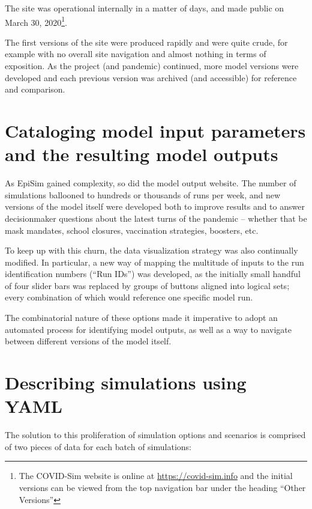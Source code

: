 The site was operational internally in a matter of days, and made public on March 30, 2020\footnote{The COVID-Sim website is online at \url{https://covid-sim.info} and the initial versions can be viewed from the top navigation bar under the heading ``Other Versions''}.

The first versions of the site were produced rapidly and were quite crude, for example with no overall site navigation and almost nothing in terms of exposition. As the project (and pandemic) continued, more model versions were developed and each previous version was archived (and accessible) for reference and comparison.

\hypertarget{covid-cataloging-model-input-parameters-and-the-resulting-model-outputs}{%
\section{Cataloging model input parameters and the resulting model outputs}\label{cataloging-model-input-parameters-and-the-resulting-model-outputs}}

As EpiSim gained complexity, so did the model output website. The number of simulations ballooned to hundreds or thousands of runs per week, and new versions of the model itself were developed both to improve results and to answer decisionmaker questions about the latest turns of the pandemic -- whether that be mask mandates, school closures, vaccination strategies, boosters, etc.

To keep up with this churn, the data visualization strategy was also continually modified. In particular, a new way of mapping the multitude of inputs to the run identification numbers (``Run IDs'') was developed, as the initially small handful of four slider bars was replaced by groups of buttons aligned into logical sets; every combination of which would reference one specific model run.

The combinatorial nature of these options made it imperative to adopt an automated process for identifying model outputs, as well as a way to navigate between different versions of the model itself.

\hypertarget{covid-describing-simulations-using-yaml}{%
\section{Describing simulations using YAML}\label{covid-describing-simulations-using-yaml}}

The solution to this proliferation of simulation options and scenarios is comprised of two pieces of data for each batch of simulations:

